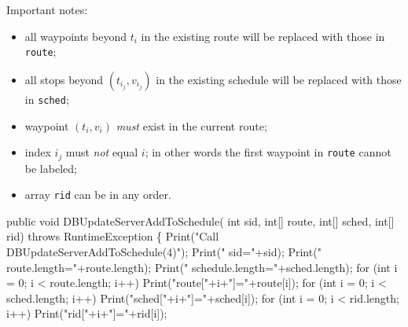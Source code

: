 \documentclass{article}
\theoremstyle{definition}                   %
\begin{document}
Important notes:
\begin{itemize}
\item all waypoints beyond $t_i$ in the existing route will be replaced with
those in {\tt{}route};
\item all stops beyond $(t_{i_j},v_{i_j})$ in the existing schedule will be
replaced with those in {\tt{}sched};
\item waypoint $(t_i,v_i)$ \emph{must} exist in the current route;
\item index $i_j$ must \emph{not} equal $i$; in other words the first waypoint
in {\tt{}route} cannot be labeled;
\item array {\tt{}rid} can be in any order.
\end{itemize}
\nwenddocs{}\endmoddef{}
public void DBUpdateServerAddToSchedule(
    int sid, int[] route, int[] sched, int[] rid)
throws RuntimeException \{
  Print("Call DBUpdateServerAddToSchedule(4)");
  Print("  sid="+sid);
  Print("  route.length="+route.length);
  Print("  schedule.length="+sched.length);
  for (int i = 0; i < route.length; i++)
    Print("route["+i+"]="+route[i]);
  for (int i = 0; i < sched.length; i++)
    Print("sched["+i+"]="+sched[i]);
  for (int i = 0; i < rid.length; i++)
    Print("rid["+i+"]="+rid[i]);
\end{document}
